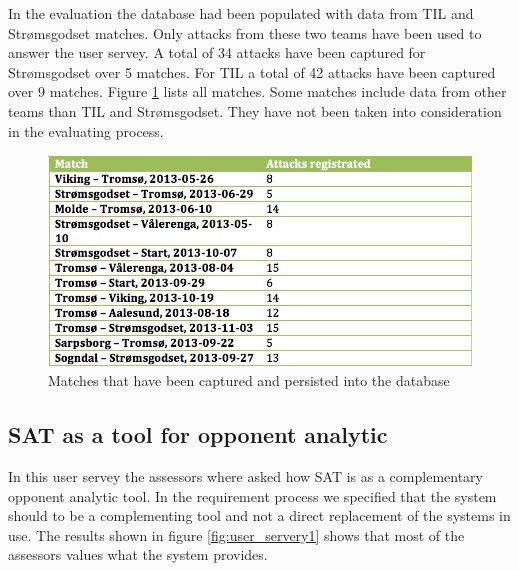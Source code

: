 In the evaluation the database had been populated with data from \ac{TIL} and Str{\o}msgodset matches. Only attacks from these two teams have been used to answer the user servey. A total of 34 attacks have been captured for Str{\o}msgodset over 5 matches. For \ac{TIL} a total of 42 attacks have been captured over 9 matches. Figure \ref{fig:matches_regged} lists all matches. Some matches include data from other teams than \ac{TIL} and Str{\o}msgodset. They have not been taken into consideration in the evaluating process.

\begin{figure}[ht!]
\centering
\includegraphics[width=1\textwidth]{images/evaluation/matched_regged.png}
\caption{Matches that have been captured and persisted into the database}
\label{fig:matches_regged}
\end{figure}

\subsection{SAT as a tool for opponent analytic}

In this user servey the assessors where asked how SAT is as a complementary opponent analytic tool. In the requirement process we specified that the system should to be a complementing tool and not a direct replacement of the systems in use. The results shown in figure \ref{fig:user_servery1} shows that most of the assessors values what the system provides. 

